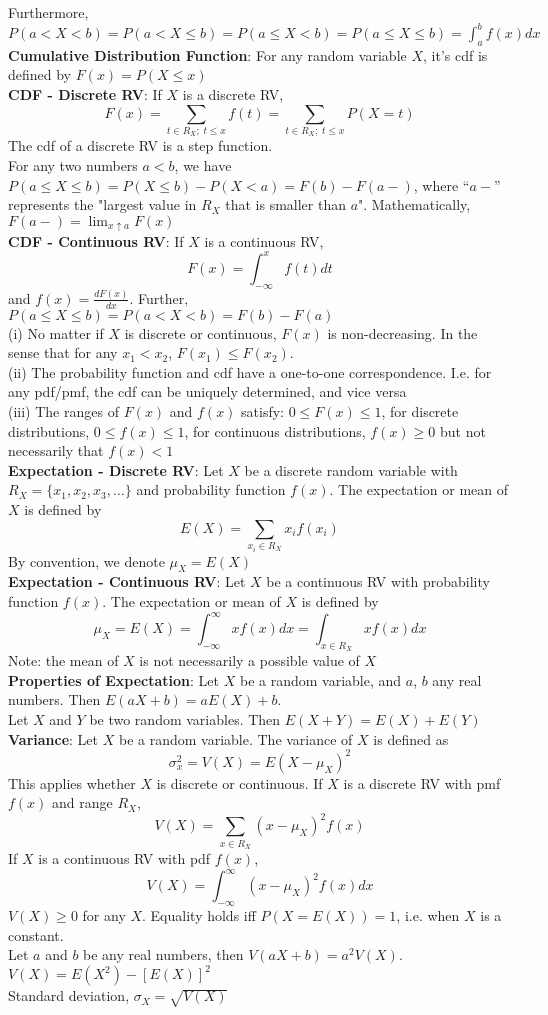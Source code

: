 \documentclass{article}
\begin{document}
\begin{multicols*}{2}
Furthermore, $P(a<X<b)=P(a<X\leq b)=P(a\leq X<b)=P(a\leq X\leq b)=\int^b_af(x)dx$\\
\textbf{Cumulative Distribution Function}: For any random variable $X$, it's cdf is defined by $F(x)=P(X\leq x)$ \\
\textbf{CDF - Discrete RV}: If $X$ is a discrete RV, $$F(x)=\sum_{t\in R_X; \; t\leq x}f(t)=\sum_{t\in R_X; \; t\leq x} P(X=t)$$ The cdf of a discrete RV is a step function. \\
For any two numbers $a < b$, we have
$P(a\leq X \leq b)=P(X \leq b)-P(X <a)=F(b)-F(a-)$,
where ``$a-$'' represents the "largest value in $R_X$ that is smaller than $a$". Mathematically, $F(a-)=\lim_{x\uparrow a} F(x)$ \\
\textbf{CDF - Continuous RV}: If $X$ is a continuous RV, $$F(x)=\int^x_{-\infty}f(t)dt$$ and $f(x)=\frac{dF(x)}{dx}$. Further, $P(a\leq X\leq b)=P(a<X<b)=F(b)-F(a)$ \\
(i) No matter if $X$ is discrete or continuous, $F(x)$ is non-decreasing. In the sense that for any $x_1<x_2$, $F(x_1)\leq F(x_2)$. \\
(ii) The probability function and cdf have a one-to-one correspondence. I.e. for any pdf/pmf, the cdf can be uniquely determined, and vice versa \\
(iii) The ranges of $F(x)$ and $f(x)$ satisfy: $0\leq F(x)\leq 1$, for discrete distributions, $0\leq f(x)\leq 1$, for continuous distributions, $f(x)\geq 0$ but not necessarily that $f(x)< 1$\\
\textbf{Expectation - Discrete RV}: Let $X$ be a discrete random variable with $ R_X =\{x_1 ,x_2,x_3,\dots \}$ and probability function $f (x)$. The expectation or mean of $X$ is defined by $$E(X)=\sum_{x_i\in R_X}x_if(x_i)$$ By convention, we denote $\mu_X=E(X)$\\
\textbf{Expectation - Continuous RV}: Let $X$ be a continuous RV with probability function $f (x)$. The expectation or mean of $X$ is defined by $$\mu_X=E(X)=\int^\infty_{-\infty}xf(x)dx=\int_{x\in R_X}xf(x)dx$$ Note: the mean of $X$ is not necessarily a possible value of $X$ \\
\textbf{Properties of Expectation}: Let $X$ be a random variable, and $a$, $b$ any real numbers. Then $E(aX+b)=aE(X)+b$. \\
Let $X$ and $Y$ be two random variables. Then $E(X+Y)=E(X)+E(Y)$\\
\textbf{Variance}: Let $X$ be a random variable. The variance of $X$ is defined as $$\sigma^2_x=V(X)=E(X-\mu_X)^2$$ 
This applies whether $X$ is discrete or continuous. If $X$ is a discrete RV with pmf $f(x)$ and range $R_X$, $$V(X)=\sum_{x\in R_X}(x-\mu_X)^2f(x)$$
If $X$ is a continuous RV with pdf $f(x)$, $$V(X)=\int_{-\infty}^\infty (x-\mu_X)^2f(x)dx$$
$V(X)\geq0$ for any $X$. Equality holds iff $P(X=E(X))=1$, i.e. when $X$ is a constant. \\
Let $a$ and $b$ be any real numbers, then $V(aX+b)=a^2V(X)$. \\
$V(X)=E(X^2)-[E(X)]^2$\\
Standard deviation, $\sigma_X=\sqrt{V(X)}$\\

\end{multicols*}
\end{document}
